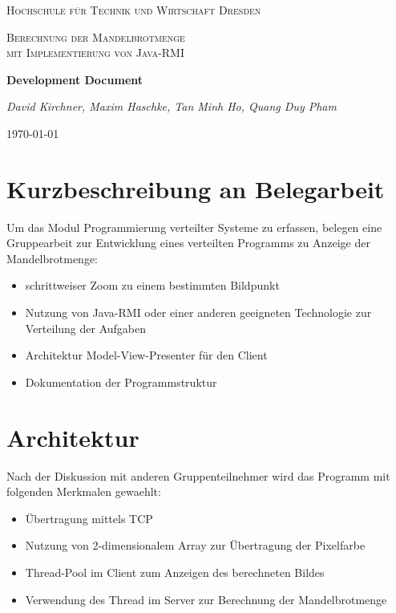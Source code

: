 \documentclass{article}
\begin{document}
\begin{titlepage}
    \centering
    {\scshape\LARGE Hochschule für Technik und Wirtschaft Dresden \par}
    \vspace{1cm}
    {\scshape\Large Berechnung der Mandelbrotmenge \\mit Implementierung von Java-RMI \par}
    \vspace{1.5cm}
    {\huge\bfseries Development Document\par}
    \vspace{2cm}
    {\Large\itshape David Kirchner, Maxim Haschke, Tan Minh Ho, Quang Duy Pham\par}
    \vfill

    {\large \today\par}
\end{titlepage}

\tableofcontents

\newpage
\section{Kurzbeschreibung an Belegarbeit}
	Um das Modul Programmierung verteilter Systeme zu erfassen, belegen eine Gruppearbeit zur Entwicklung eines verteilten Programms zu Anzeige der Mandelbrotmenge: 
	\begin{itemize}
		\item schrittweiser Zoom zu einem bestimmten Bildpunkt
		\item Nutzung von Java-RMI oder einer anderen geeigneten Technologie zur Verteilung der Aufgaben
		\item Architektur Model-View-Presenter für den Client
		\item Dokumentation der Programmstruktur
	\end{itemize}

\section{Architektur}
	Nach der Diskussion mit anderen Gruppenteilnehmer wird das Programm mit folgenden Merkmalen gewaehlt:
	\begin{itemize}
		\item Übertragung mittels TCP
		\item Nutzung von 2-dimensionalem Array zur Übertragung der Pixelfarbe
		\item Thread-Pool im Client zum Anzeigen des berechneten Bildes
		\item Verwendung des Thread im Server zur Berechnung der Mandelbrotmenge
	\end{itemize}
	
\end{document}
